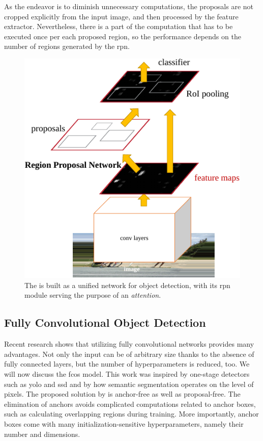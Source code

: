 As the endeavor is to diminish unnecessary computations, the proposals are not cropped explicitly from the input image, and then processed by the feature extractor. Nevertheless, there is a part of the computation that has to be executed once per each proposed region, so the performance depends on the number of regions generated by the \gls{rpn}.

\begin{figure}[t]
    \centerline{\includegraphics[width=0.5\linewidth]{figures/theoretical_foundations/faster_rcnn_rpn_module.pdf}}
    \caption[ with the \gls{rpn}]{The  is built as a unified network for object detection, with its \gls{rpn} module serving the purpose of an \emph{attention}. }
    \label{fig:FasterRCNNRPN}
\end{figure}

\subsection{Fully Convolutional Object Detection}
\label{ssec:FullyConvolutioanlObjectDetection}


Recent research shows that utilizing fully convolutional networks provides many advantages. Not only the input can be of arbitrary size thanks to the absence of fully connected layers, but the number of hyperparameters is reduced, too. We will now discuss the \gls{fcos} model. This work was inspired by one-stage detectors such as \gls{yolo} and \gls{ssd} and by how semantic segmentation operates on the level of pixels. The proposed solution by \cite{Tian2019} is anchor-free as well as proposal-free. The elimination of anchors avoids complicated computations related to anchor boxes, such as calculating overlapping regions during training. More importantly, anchor boxes come with many initialization-sensitive hyperparameters, namely their number and dimensions.

